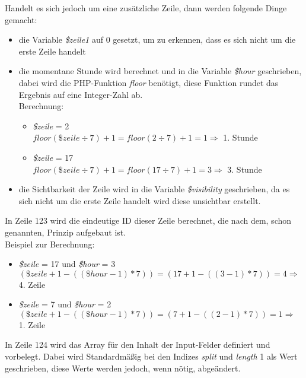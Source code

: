 \begin{enumerate}
	Handelt es sich jedoch um eine zusätzliche Zeile, dann werden folgende Dinge gemacht:
	
	\begin{itemize}
		\item die Variable \textit{\$zeile1} auf 0 gesetzt, um zu erkennen, dass es sich nicht um die erste Zeile handelt
		\item die momentane Stunde wird berechnet und in die Variable \textit{\$hour} geschrieben, dabei wird die PHP-Funktion \textit{floor} benötigt, diese Funktion rundet das Ergebnis auf eine Integer-Zahl ab.\\
		Berechnung:
		
		\begin{itemize}
			\item \textit{\$zeile} = 2\\
			$ floor(\$zeile \div 7) + 1 = floor( 2 \div 7 ) + 1 = 1 \Rightarrow $ 1. Stunde
			\item \textit{\$zeile} = 17\\
			$ floor(\$zeile \div 7) + 1 = floor( 17 \div 7 ) + 1 = 3 \Rightarrow $ 3. Stunde\\
		\end{itemize}
		
		\item die Sichtbarkeit der Zeile wird in die Variable \textit{\$visibility} geschrieben, da es sich nicht um die erste Zeile handelt wird diese unsichtbar erstellt.
	\end{itemize}
	
	In Zeile 123 wird die eindeutige ID dieser Zeile berechnet, die nach dem, schon genannten, Prinzip aufgebaut ist.\\
	Beispiel zur Berechnung:
	
	\begin{itemize}
		\item \textit{\$zeile} = 17 und \textit{\$hour} = 3\\
		$ (\$zeile + 1 - ((\$hour - 1 ) \ast 7)) =  (17 + 1 - ((3 - 1) \ast 7)) = 4 \Rightarrow $ 4. Zeile
		\item \textit{\$zeile} = 7 und \textit{\$hour} = 2\\
		$ (\$zeile + 1 - ((\$hour - 1 ) \ast 7)) =  (7 + 1 - ((2 - 1) \ast 7)) = 1 \Rightarrow $ 1. Zeile
	\end{itemize}
	
	In Zeile 124 wird das Array für den Inhalt der Input-Felder definiert und vorbelegt. Dabei wird Standardmäßig bei den Indizes \textit{split} und \textit{length} 1 als Wert geschrieben, diese Werte werden jedoch, wenn nötig, abgeändert.\\
	

\end{enumerate}
